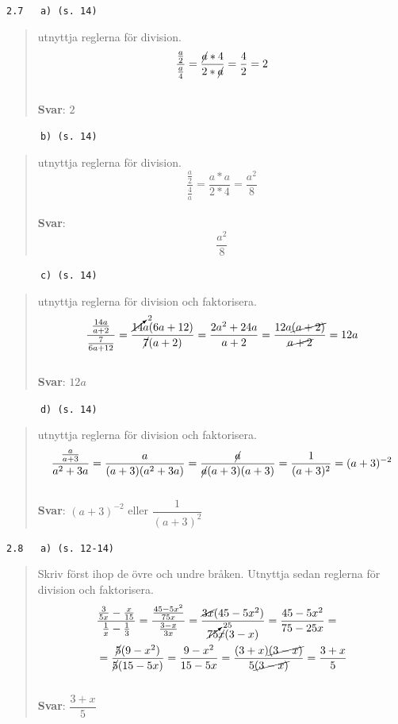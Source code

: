 \documentclass[a4paper]{article}
\newcommand{\tskcol}[1]{\textcolor{tskcol}{#1}}
\begin{document}
	\texttt{\tskcol{2.7~~~a) (s. 14)}}
	\begin{quotation}
		\noindent
		utnyttja reglerna för division.
		\[\dfrac{\frac{a}{2}}{\frac{a}{4}}=
		\dfrac{\cancel{a}*4}{2*\cancel{a}}=
		\dfrac{4}{2}=
		2\]
		\\
		\textbf{Svar}: $2$
	\end{quotation}
	
	\texttt{\tskcol{~~~~~~b) (s. 14)}}
	\begin{quotation}
		\noindent
		utnyttja reglerna för division.
		\[\dfrac{\frac{a}{2}}{\frac{4}{a}}=
		\dfrac{a*a}{2*4}=
		\dfrac{a^2}{8}\]
		\\
		\textbf{Svar}: \[\dfrac{a^2}{8}\]
	\end{quotation}
	
	\texttt{\tskcol{~~~~~~c) (s. 14)}}
	\begin{quotation}
		\noindent
		utnyttja reglerna för division och faktorisera.
		\[\dfrac{\frac{14a}{a+2}}{\frac{7}{6a+12}}=
		\dfrac{\cancelto{2}{14}a(6a+12)}{\cancel{7}(a+2)}=
		\dfrac{2a^2+24a}{a+2}=\dfrac{12a\cancel{(a+2)}}{\cancel{a+2}}=
		12a\]
		\\
		\textbf{Svar}: $12a$
	\end{quotation}
	
	\texttt{\tskcol{~~~~~~d) (s. 14)}}
	\begin{quotation}
		\noindent
		utnyttja reglerna för division och faktorisera.
		\[\dfrac{\frac{a}{a+3}}{a^2+3a}=
		\dfrac{a}{(a+3)(a^2+3a)}=
		\dfrac{\cancel{a}}{\cancel{a}(a+3)(a+3)}=
		\dfrac{1}{(a+3)^2}=
		(a+3)^{-2}\]
		\\
		\textbf{Svar}: $(a+3)^{-2}$ eller $\dfrac{1}{(a+3)^2}$
	\end{quotation}
	
	\texttt{\tskcol{2.8~~~a) (s. 12-14)}}
	\begin{quotation}
		\noindent
		Skriv först ihop de övre och undre bråken. Utnyttja sedan reglerna för division och faktorisera.
		\begin{align*}
		&\dfrac{\frac{3}{5x}-\frac{x}{15}}{\frac{1}{x}-\frac{1}{3}}=
		\dfrac{\frac{45-5x^2}{75x}}{\frac{3-x}{3x}}=
		\dfrac{\cancel{3x}(45-5x^2)}{\cancelto{25}{75}\cancel{x}(3-x)}=
		\dfrac{45-5x^2}{75-25x}= \\
		&=\dfrac{\cancel{5}(9-x^2)}{\cancel{5}(15-5x)}=
		\dfrac{9-x^2}{15-5x}=
		\dfrac{(3+x)\cancel{(3-x)}}{5\cancel{(3-x)}}=
		\dfrac{3+x}{5}
		\end{align*}
		\\
		\textbf{Svar}: $\dfrac{3+x}{5}$
	\end{quotation}
	
\end{document}
